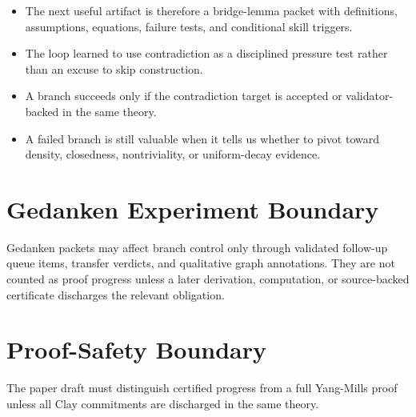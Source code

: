 \documentclass[11pt]{article}
\begin{document}
\begin{itemize}
\item The next useful artifact is therefore a bridge-lemma packet with definitions, assumptions, equations, failure tests, and conditional skill triggers.
\item The loop learned to use contradiction as a disciplined pressure test rather than an excuse to skip construction.
\item A branch succeeds only if the contradiction target is accepted or validator-backed in the same theory.
\item A failed branch is still valuable when it tells us whether to pivot toward density, closedness, nontriviality, or uniform-decay evidence.
\end{itemize}

\section{Gedanken Experiment Boundary}

Gedanken packets may affect branch control only through validated follow-up queue items, transfer verdicts, and qualitative graph annotations. They are not counted as proof progress unless a later derivation, computation, or source-backed certificate discharges the relevant obligation.

\section{Proof-Safety Boundary}

The paper draft must distinguish certified progress from a full Yang-Mills proof unless all Clay commitments are discharged in the same theory.
\end{document}
